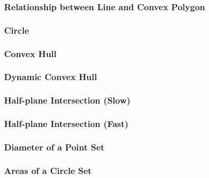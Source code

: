 \subsubsection{Relationship between Line and Convex Polygon} %


\subsubsection{Circle} %


\subsubsection{Convex Hull} %


\subsubsection{Dynamic Convex Hull} %


\subsubsection{Half-plane Intersection (Slow)} %


\subsubsection{Half-plane Intersection (Fast)} %


\subsubsection{Diameter of a Point Set} %


\subsubsection{Areas of a Circle Set} %


